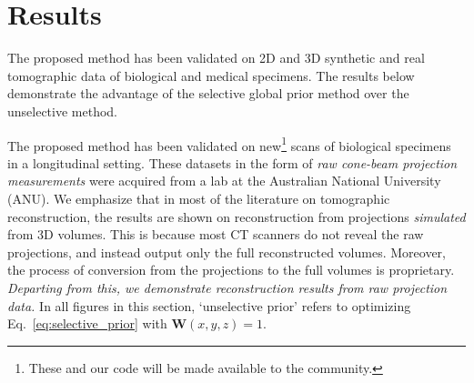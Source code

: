 \documentclass[journal]{IEEEtran}
\begin{document}
\section{Results}
\label{sec:results}

The proposed method has been validated on 2D and 3D synthetic and real tomographic data of biological and medical specimens. The results below demonstrate the advantage of the selective global prior method over the unselective method.





The proposed method has been validated on new\footnote {These and our code will be made available to the community.} scans of biological specimens in a longitudinal setting. These datasets in the form of \emph{raw cone-beam projection measurements} were acquired from a lab at the Australian National University (ANU). We emphasize that in most of the literature on tomographic reconstruction, the results are shown on reconstruction from projections \emph{simulated} from 3D volumes. This is because most CT scanners do not reveal the raw projections, and instead output only the full reconstructed volumes. Moreover, the process of conversion from the projections to the full volumes is proprietary. \emph{Departing from this, we demonstrate reconstruction results from raw projection data.} In all figures in this section, `unselective prior' refers to optimizing Eq.~\ref{eq:selective_prior} with $\boldsymbol{W}(x,y,z)=1$.
\end{document}
